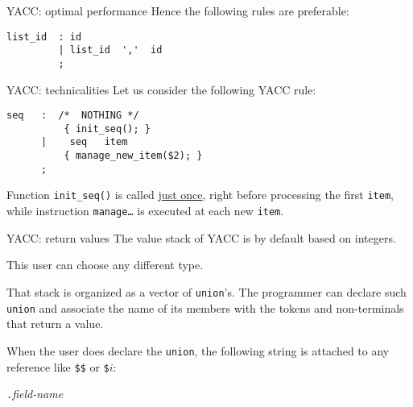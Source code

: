 \begin{frame}[fragile]{YACC: optimal performance}
Hence the following rules are preferable:


\vspace{20pt}

\begin{verbatim}
list_id  : id
         | list_id  ','  id
         ;
\end{verbatim}



\end{frame}
\begin{frame}[fragile]{YACC: technicalities}
Let us consider the following YACC rule:


\vspace{20pt}

\begin{verbatim}
seq   :  /*  NOTHING */
          { init_seq(); }
      |    seq   item
          { manage_new_item($2); }
      ;
\end{verbatim}


\vspace{20pt}

Function {\tt init\_seq()} is called
\underline{just once}, right before processing the first {\tt item},
while instruction {\tt manage\ldots} is executed at each new
{\tt item}.





\end{frame}
\begin{frame}[fragile]{YACC: return values}
The value stack of YACC is by default based on integers\label{ytc}.


\vspace{20pt}

This user can choose any different type.


\vspace{20pt}

That stack is organized as a vector of {\tt union}'s.
The programmer can declare such {\tt union} and associate the name of its members
with the tokens and non-terminals that return a value.


\vspace{20pt}

When the user does declare the {\tt union}, the following string
is attached to any reference like
\verb"$$" or \verb"$"$i$:


\vspace{20pt}

\begin{center}
\verb"."{\em field-name}
\end{center}



\end{frame}
